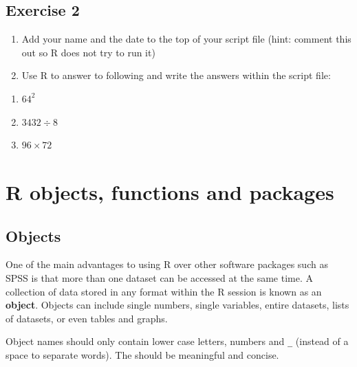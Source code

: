 \documentclass[
  letterpaper,
  DIV=11,
  numbers=noendperiod]{scrreprt}
\providecommand{\tightlist}{%
  \setlength{\itemsep}{0pt}\setlength{\parskip}{0pt}}\usepackage{longtable,booktabs,array}
\begin{document}
\section{Exercise 2}\label{exercise-2}

\begin{enumerate}
\def\labelenumi{\arabic{enumi}.}
\tightlist
\item
  Add your name and the date to the top of your script file (hint:
  comment this out so R does not try to run it)
\item
  Use R to answer to following and write the answers within the script
  file:
\end{enumerate}

\begin{enumerate}
\def\labelenumi{\alph{enumi}.}
\tightlist
\item
  \(64^2\)
\item
  \(3432 \div 8\)
\item
  \(96 \times 72\)
\end{enumerate}


\chapter{R objects, functions and
packages}\label{r-objects-functions-and-packages}

\section{Objects}\label{objects}

One of the main advantages to using R over other software packages such
as SPSS is that more than one dataset can be accessed at the same time.
A collection of data stored in any format within the R session is known
as an \textbf{object}. Objects can include single numbers, single
variables, entire datasets, lists of datasets, or even tables and
graphs.

\begin{tcolorbox}[enhanced jigsaw, bottomrule=.15mm, left=2mm, leftrule=.75mm, bottomtitle=1mm, coltitle=black, colbacktitle=quarto-callout-tip-color!10!white, toptitle=1mm, arc=.35mm, breakable, title=\textcolor{quarto-callout-tip-color}{\faLightbulb}\hspace{0.5em}{Style tip}, rightrule=.15mm, toprule=.15mm, opacityback=0, opacitybacktitle=0.6, titlerule=0mm, colback=white, colframe=quarto-callout-tip-color-frame]

Object names should only contain lower case letters, numbers and
\texttt{\_} (instead of a space to separate words). The should be
meaningful and concise.

\end{tcolorbox}
\end{document}
